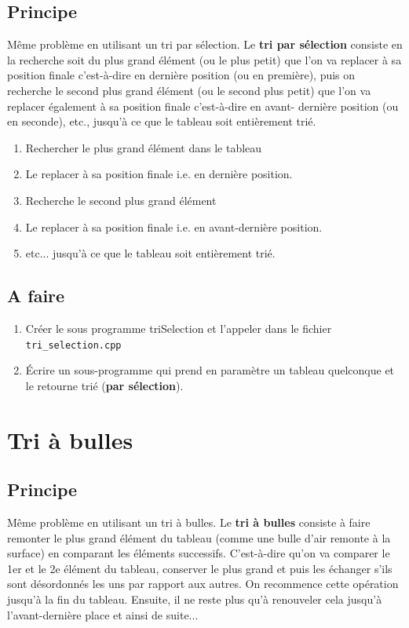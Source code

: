 \documentclass[french]{article}
\begin{document}
\subsection*{Principe}

Même problème en utilisant un tri par sélection. Le \textbf{tri par sélection} consiste en la recherche soit du plus grand élément (ou le plus petit) que l'on va replacer à sa position finale c'est-à-dire en dernière position (ou en première), puis on recherche le second plus grand élément (ou le second plus petit) que l'on va replacer également à sa position finale c'est-à-dire en avant- dernière position (ou en seconde), etc., jusqu'à ce que le tableau soit entièrement trié.
\begin{enumerate}
	\item Rechercher le plus grand élément dans le tableau
	\item Le replacer à sa position finale i.e. en dernière position.
	\item Recherche le second plus grand élément
	\item Le replacer à sa position finale i.e. en avant-dernière position.
	\item etc... jusqu'à ce que le tableau soit entièrement trié.
\end{enumerate} 
\subsection*{A faire}
\begin{enumerate}
	\item Créer le sous programme triSelection et l'appeler dans le fichier \texttt{tri\_selection.cpp}
	\item Écrire un sous-programme qui prend en paramètre un tableau quelconque et le retourne trié (\textbf{par sélection}).
\end{enumerate}
\section{Tri à bulles}

\subsection*{Principe}
Même problème en utilisant un tri à bulles. Le \textbf{tri à bulles} consiste à faire remonter le plus grand élément du tableau (comme une bulle d'air remonte à la surface) en comparant les éléments successifs. C'est-à-dire qu'on va comparer le 1er et le 2e élément du tableau, conserver le plus grand et puis les échanger s'ils sont désordonnés les uns par rapport aux autres. On recommence cette opération jusqu'à la fin du tableau. Ensuite, il ne reste plus qu'à renouveler cela jusqu'à l'avant-dernière place et ainsi de suite...
\end{document}
